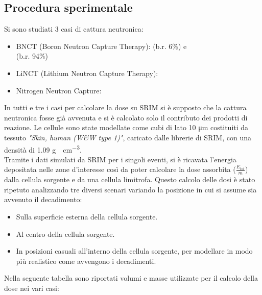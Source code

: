 \documentclass[a4paper,12pt]{article}
\begin{document}
        \subsection{Procedura sperimentale}
            Si sono studiati 3 casi di cattura neutronica:
            \begin{itemize}
                \item BNCT (Boron Neutron Capture Therapy):  (b.r. 6\%) e \\ (b.r. 94\%)
                \item LiNCT (Lithium Neutron Capture Therapy): 
                \item Nitrogen Neutron Capture: 
            \end{itemize}
            In tutti e tre i casi per calcolare la dose su SRIM si è supposto che la cattura neutronica fosse già avvenuta e si è calcolato solo il contributo dei prodotti di reazione.
            Le cellule sono state modellate come cubi di lato 10 \unit{\micro\meter} costituiti da tessuto \textit{"Skin, human (W\&W type 1)"}, caricato dalle librerie di SRIM, con una densità di 1.09 \unit{\gram \cdot \centi\meter^{-3}}.
            \\
            Tramite i dati simulati da SRIM per i singoli eventi, si è ricavata l'energia depositata nelle zone d'interesse così da poter calcolare la dose assorbita ($\frac{E_{tot}}{m}$) dalla cellula sorgente e da una cellula limitrofa. 
            Questo calcolo delle dosi è stato ripetuto analizzando tre diversi scenari variando la posizione in cui si assume sia avvenuto il decadimento:
            \begin{itemize}
                \item Sulla superficie esterna della cellula sorgente.
                \item Al centro della cellula sorgente.
                \item In posizioni casuali all'interno della cellula sorgente, per modellare in modo più realistico come avvengono i decadimenti.
            \end{itemize}

            Nella seguente tabella sono riportati volumi e masse utilizzate per il calcolo della dose nei vari casi:
\end{document}
